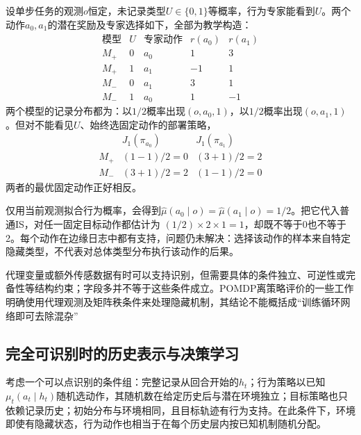 \begin{example}[同样日志与相反的动作价值]
  \label{ex:rl-information-confounding}
  设单步任务的观测$o$恒定，未记录类型$U\in\{0,1\}$等概率，行为专家能看到$U$。两个动作$a_0,a_1$的潜在奖励及专家选择如下，全部为教学构造：
  \[
  \begin{array}{cc|c|rr}
    \text{模型}&U&\text{专家动作}&r(a_0)&r(a_1)\\
    \hline
    M_+&0&a_0&1&3\\
    M_+&1&a_1&-1&1\\
    M_-&0&a_1&3&1\\
    M_-&1&a_0&1&-1
  \end{array}
  \]
  两个模型的记录分布都为：以$1/2$概率出现$(o,a_0,1)$，以$1/2$概率出现$(o,a_1,1)$。但对不能看见$U$、始终选固定动作的部署策略，
  \[
  \begin{array}{c|rr}
    &J_1(\pi_{a_0})&J_1(\pi_{a_1})\\
    \hline
    M_+&(1-1)/2=0&(3+1)/2=2\\
    M_-&(3+1)/2=2&(1-1)/2=0
  \end{array}
  \]
  两者的最优固定动作正好相反。
\end{example}

仅用当前观测拟合行为概率，会得到$\widehat\mu(a_0\mid o)=\widehat\mu(a_1\mid o)=1/2$。把它代入普通IS，对任一固定目标动作都估计为
$(1/2)\times2\times1=1$，却既不等于0也不等于2。每个动作在边缘日志中都有支持，问题仍未解决：选择该动作的样本来自特定隐藏类型，不代表对总体类型分布执行该动作的后果。

代理变量或额外传感数据有时可以支持识别，但需要具体的条件独立、可逆性或完备性等结构约束；字段多并不等于这些条件成立。POMDP离策略评价的一些工作明确使用代理观测及矩阵秩条件来处理隐藏机制，其结论不能概括成“训练循环网络即可去除混杂”

\subsection{完全可识别时的历史表示与决策学习}
\label{sec:rl-information-full-identification}

考虑一个可以点识别的条件组：完整记录从回合开始的$h_t$；行为策略以已知$\mu_t(a_t\mid h_t)$随机选动作，其随机数在给定历史后与潜在环境独立；目标策略也只依赖记录历史；初始分布与环境相同，且目标轨迹有行为支持。在此条件下，环境即使有隐藏状态，行为动作也相当于在每个历史层内按已知机制随机分配。

